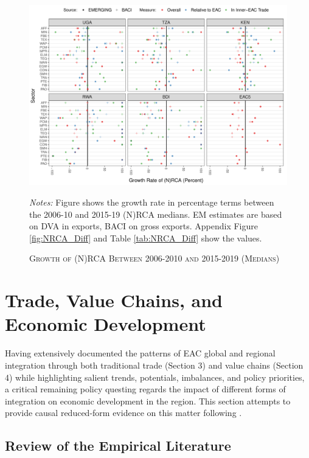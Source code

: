 \documentclass[a4paper]{article}
\begin{document}
\begin{figure}[h!]
\centering
\caption{\label{fig:NRCA_GR}\textsc{Growth of (N)RCA Between 2006-2010 and 2015-2019 (Medians)}}
\includegraphics[width=1\textwidth]{"Figures/NRCA_EAC5_ALL_Growth.pdf"} \\ \raggedright
\scriptsize
\emph{Notes:} Figure shows the growth rate in percentage terms between the 2006-10 and 2015-19 (N)RCA medians. EM estimates are based on DVA in exports, BACI on gross exports. Appendix Figure \ref{fig:NRCA_Diff} and Table \ref{tab:NRCA_Diff} show the values. 
\end{figure}
\FloatBarrier



 
 
\section{Trade, Value Chains, and Economic Development}

Having extensively documented the patterns of EAC global and regional integration through both traditional trade (Section 3) and value chains (Section 4) while highlighting salient trends, potentials, imbalances, and policy priorities, a critical remaining policy questing regards the impact of different forms of integration on economic development in the region. This section attempts to provide causal reduced-form evidence on this matter following \citet{Kummritz20161}. 


\subsection{Review of the Empirical Literature}
\end{document}
